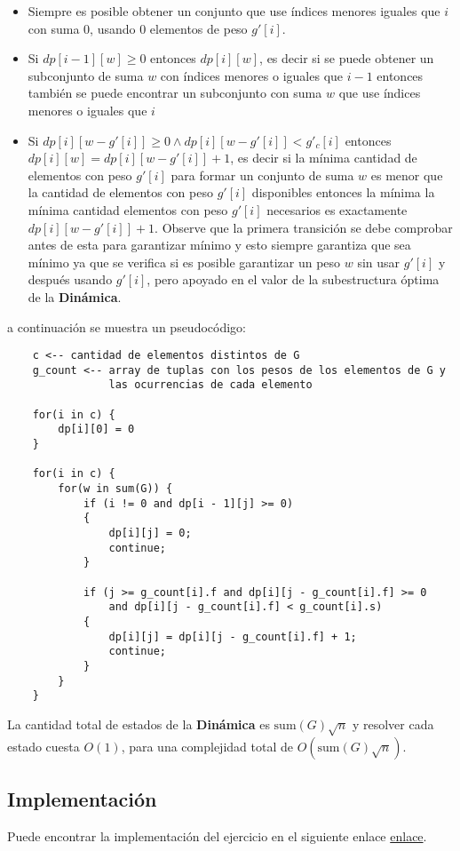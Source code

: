 \documentclass{article}
\begin{document}
\begin{itemize}
    \item Siempre es posible obtener un conjunto que use índices menores iguales que $i$ con suma 0, usando 0 elementos de peso $g'[i]$.
    \item Si $dp[i-1][w]\geq 0$ entonces $dp[i][w]$, es decir si se puede obtener un subconjunto de suma
          $w$ con índices menores o iguales que $i-1$ entonces también se puede encontrar un subconjunto con suma $w$ que use
          índices menores o iguales que $i$
    \item Si $dp[i][w - g'[i]] \geq 0 \wedge dp[i][w - g'[i]] < g'_c[i]$ entonces $dp[i][w]= dp[i][w - g'[i]]+1$, es decir
          si la mínima cantidad de elementos con peso $g'[i]$ para formar un conjunto de suma $w$ es menor que la cantidad
          de elementos con peso $g'[i]$ disponibles entonces la mínima la mínima cantidad elementos con peso $g'[i]$ necesarios
          es exactamente $dp[i][w - g'[i]]+1$. Observe que la primera transición se debe comprobar antes de esta para garantizar
          mínimo y esto siempre garantiza que sea mínimo ya que se verifica si es posible garantizar un peso $w$ sin usar $g'[i]$
          y después usando $g'[i]$, pero apoyado en el valor de la subestructura óptima de la \textbf{Dinámica}.
\end{itemize}
a continuación se muestra un pseudocódigo:

\begin{verbatim}
    c <-- cantidad de elementos distintos de G
    g_count <-- array de tuplas con los pesos de los elementos de G y 
                las ocurrencias de cada elemento

    for(i in c) {
        dp[i][0] = 0
    }

    for(i in c) { 
        for(w in sum(G)) {
            if (i != 0 and dp[i - 1][j] >= 0)
            {
                dp[i][j] = 0;
                continue;
            }

            if (j >= g_count[i].f and dp[i][j - g_count[i].f] >= 0 
                and dp[i][j - g_count[i].f] < g_count[i].s)
            {
                dp[i][j] = dp[i][j - g_count[i].f] + 1;
                continue;
            }
        }
    }
\end{verbatim}
La cantidad total de estados de la \textbf{Dinámica} es $\text{sum}(G)\sqrt{n}$ y resolver cada estado cuesta $O(1)$, para
una complejidad total de $O(\text{sum}(G)\sqrt{n})$.

\subsection{Implementación}

Puede encontrar la implementación del ejercicio en el siguiente enlace \href{https://github.com/raudel25/DAA-Project/blob/main/problems/c/c.cpp}{enlace}.
\end{document}
